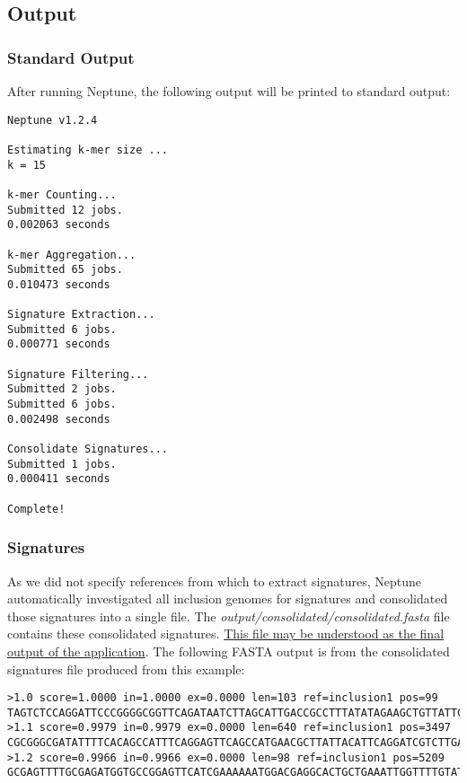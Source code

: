 \documentclass[a4paper,10pt]{article}
\begin{document}
\subsection{Output}

\subsubsection{Standard Output}

After running Neptune, the following output will be printed to standard output:

\begin{minipage}{\linewidth}
\begin{lstlisting}[frame=single, style=bash]
Neptune v1.2.4

Estimating k-mer size ...
k = 15

k-mer Counting...
Submitted 12 jobs.
0.002063 seconds

k-mer Aggregation...
Submitted 65 jobs.
0.010473 seconds

Signature Extraction...
Submitted 6 jobs.
0.000771 seconds

Signature Filtering...
Submitted 2 jobs.
Submitted 6 jobs.
0.002498 seconds

Consolidate Signatures...
Submitted 1 jobs.
0.000411 seconds

Complete!
\end{lstlisting}
\end{minipage}

\subsubsection{Signatures}

As we did not specify references from which to extract signatures, Neptune automatically investigated all inclusion genomes for signatures and consolidated those signatures into a single file. The \textit{output/consolidated/consolidated.fasta} file contains these consolidated signatures. \ul{This file may be understood as the final output of the application}. The following FASTA output is from the consolidated signatures file produced from this example:

\begin{minipage}{\linewidth}
\begin{lstlisting}[frame=single, style=bash, title=output/consolidated/consolidated.fasta]
>1.0 score=1.0000 in=1.0000 ex=0.0000 len=103 ref=inclusion1 pos=99
TAGTCTCCAGGATTCCCGGGGCGGTTCAGATAATCTTAGCATTGACCGCCTTTATATAGAAGCTGTTATTCAAGAAGCAT...
>1.1 score=0.9979 in=0.9979 ex=0.0000 len=640 ref=inclusion1 pos=3497
CGCGGGCGATATTTTCACAGCCATTTCAGGAGTTCAGCCATGAACGCTTATTACATTCAGGATCGTCTTGAGGCTCAGAG...
>1.2 score=0.9966 in=0.9966 ex=0.0000 len=98 ref=inclusion1 pos=5209
GCGAGTTTTGCGAGATGGTGCCGGAGTTCATCGAAAAAATGGACGAGGCACTGCTGAAATTGGTTTTGTATTTGGGGAGC...
\end{lstlisting}
\end{minipage}
\end{document}
